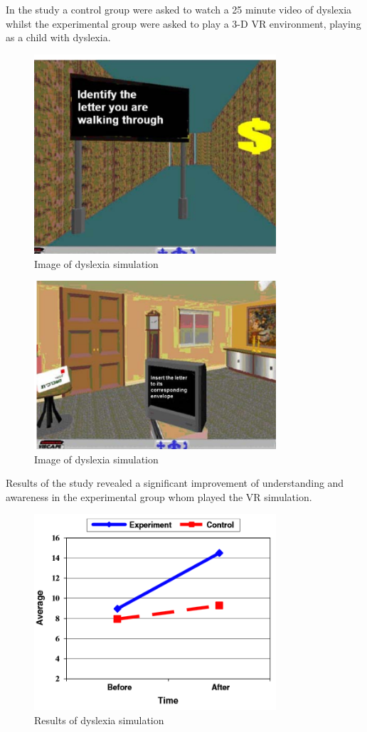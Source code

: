 In the study\cite{dyslexicsimpar} a control group were asked to watch a 25 minute video of dyslexia whilst the experimental group were asked to play a 3-D VR environment, playing as a child with dyslexia.

\begin{figure}[H]
\centering
\includegraphics[width=90mm]{images/litreview/dsim1.png}
\caption{Image of dyslexia simulation}
\label{autisim1}
\end{figure}

\begin{figure}[H]
\centering
\includegraphics[width=90mm]{images/litreview/dsim2.png}
\caption{Image of dyslexia simulation}
\label{autisim1}
\end{figure}

Results of the study revealed a significant improvement of understanding and awareness in the experimental group whom played the VR simulation.

\begin{figure}[H]
\centering
\includegraphics[width=90mm]{images/litreview/dsimresults.png}
\caption{Results of dyslexia simulation}
\label{autisim1}
\end{figure}

